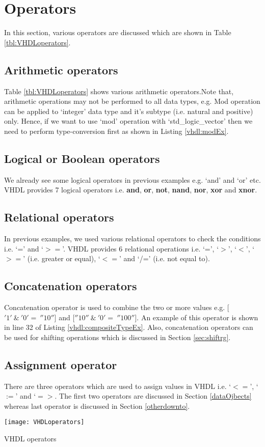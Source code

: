 \section{Operators}\label{sec:opearators}
In this section, various operators are discussed which are shown in Table \ref{tbl:VHDLoperators}. 

\subsection*{Arithmetic operators}
Table \ref{tbl:VHDLoperators} shows various arithmetic operators.Note that, arithmetic operations may not be performed to all data types, e.g. Mod operation can be applied to `integer' data type and it's subtype (i.e. natural and positive) only. Hence, if we want to use  `mod' operation with `std\_logic\_vector' then we need to perform type-conversion first as shown in Listing \ref{vhdl:modEx}. 

\subsection*{Logical or Boolean operators}
We already see some logical operators in previous examples e.g. `and' and `or' etc. VHDL provides 7 logical operators i.e. \textbf{and}, \textbf{or}, \textbf{not}, \textbf{nand}, \textbf{nor}, \textbf{xor} and \textbf{xnor}.

\subsection*{Relational operators}
In previous examples, we used various relational operators to check the conditions i.e. `=' and `$>=$'. VHDL provides 6 relational operations i.e. `=', `$>$', `$<$', `$>=$' (i.e. greater or equal), `$<=$' and `/=' (i.e. not equal to). 

\subsection*{Concatenation operators}\label{concatenationOp}
Concatenation operator is used to combine the two or more values e.g. [$'1'{ \ }\& { \ }'0' = { \ }''$$10''$] and [$''10''{ \ }\& { \ }'0' = { \ }''$$100''$]. An example of this operator is shown in line 32 of Listing \ref{vhdl:compositeTypeEx}. Also, concatenation operators can be used for shifting operations which is discussed in Section \ref{sec:shiftrg}. 

\subsection*{Assignment operator}
There are three operators which are used to assign values in VHDL i.e. `$<=$', `$:=$' and `$=>$. The first two operators are discussed in Section \ref{dataOjbects} whereas last operator is discussed in Section \ref{otherdownto}. 
\begin{table}[!h]
	\centering
	\texttt{[image: VHDLoperators]}
	\caption{VHDL operators}
	\label{tbl:VHDLoperators}
\end{table}

